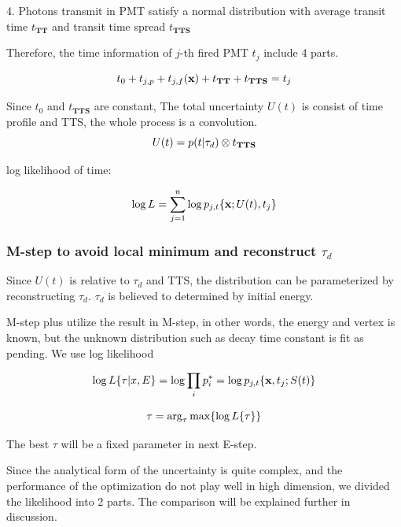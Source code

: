 \documentclass{article}
\begin{document}
	\par 4. Photons transmit in PMT satisfy a normal distribution with average transit time $t_{\textbf{TT}}$ and transit time spread $t_{\textbf{TTS}}$

	Therefore, the time information of $j$-th fired PMT $t_j$ include 4 parts. 

	\begin{equation}
	\numberwithin{equation}{section}
	t_{0} + t_{j,p} + t_{j,f}({\textbf x}) +  t_{\textbf{TT}} + t_{\textbf{TTS}}= t_{j} 
	\end{equation}	
	
	\par Since $t_{0}$ and $t_{\textbf{TTS}}$ are constant, The total uncertainty $U(t)$ is consist of time profile and TTS, the whole process is a convolution.
	\begin{equation}
	\numberwithin{equation}{section}
		U(t) =  p(t|\tau_d)\otimes t_{\textbf{TTS}}
	\end{equation}

	\par log likelihood of time:

	\begin{equation}
		\numberwithin{equation}{section}
		\log L = \sum_{j=1}^n \log p_{j,t}\{{\textbf x}; U(t), t_{j}\}
	\end{equation}
\subsubsection{M-step to avoid local minimum and reconstruct $\tau_d$ }
\par Since $U(t)$ is relative to $\tau_d$ and TTS, the distribution can be parameterized by reconstructing $\tau_d$. $\tau_d$ is believed to determined by initial energy. 
\par M-step plus utilize the result in M-step, in other words, the energy and vertex is known, but the unknown distribution such as decay time constant is fit as pending. We use log likelihood 


	\begin{equation}
	\numberwithin{equation}{section}
		\log L\{\tau|x,E\} = \log \prod_{i} p^*_i = \log p_{j,t}\{{\textbf x},t_{j};S(t)\}
	\end{equation}

	\begin{equation}
	\numberwithin{equation}{section}
		\tau = \arg_\tau{\max\{\log L\{\tau\}\}}
	\end{equation}
\par The best $\tau$ will be a fixed parameter in next E-step.
\par Since the analytical form of the uncertainty is quite complex, and the performance of the optimization do not play well in high dimension, we divided the likelihood into 2 parts. The comparison will be explained further in discussion.
\end{document}
